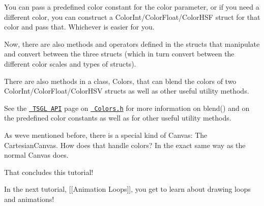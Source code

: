 You can pass a predefined color constant for the color parameter, or if you need a different color, you can construct a {\ttfamily Color\+Int/\+Color\+Float/\+Color\+H\+SF} struct for that color and pass that. Whichever is easier for you.

Now, there are also methods and operators defined in the structs that manipulate and convert between the three structs (which in turn convert between the different color scales and types of structs).

There are also methods in a class, {\ttfamily Colors}, that can blend the colors of two {\ttfamily Color\+Int/\+Color\+Float/\+Color\+H\+SV} structs as well as other useful utility methods.

See the \href{http://calvin-cs.github.io/TSGL/html/annotated.html}{\texttt{ T\+S\+GL A\+PI}} page on \href{http://calvin-cs.github.io/TSGL/html/classtsgl_1_1_colors.html}{\texttt{ Colors.\+h}} for more information on {\ttfamily blend()} and on the predefined color constants as well as for other useful utility methods.

As we\textquotesingle{}ve mentioned before, there is a special kind of Canvas\+: The Cartesian\+Canvas. How does that handle colors? In the exact same way as the normal Canvas does.

That concludes this tutorial!

In the next tutorial, \mbox{[}\mbox{[}Animation Loops\mbox{]}\mbox{]}, you get to learn about drawing loops and animations! 